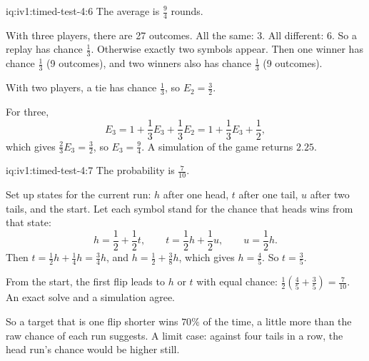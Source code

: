 \begin{solution}{iq:iv1:timed-test-4:6}
The average is $\frac94$ rounds.

With three players, there are 27 outcomes. All the same: 3. All different: 6. So a replay has chance $\frac13$. Otherwise exactly two symbols appear. Then one winner has chance $\frac13$ (9 outcomes), and two winners also has chance $\frac13$ (9 outcomes).

With two players, a tie has chance $\frac13$, so $E_2 = \frac32$.

For three,
\[
E_3 = 1 + \frac13E_3 + \frac13E_2 = 1 + \frac13E_3 + \frac12,
\]
which gives $\frac23E_3 = \frac32$, so $E_3 = \frac94$. A simulation of the game returns $2.25$.

\end{solution}

\begin{solution}{iq:iv1:timed-test-4:7}
The probability is $\frac{7}{10}$.

Set up states for the current run: $h$ after one head, $t$ after one tail, $u$ after two tails, and the start. Let each symbol stand for the chance that heads wins from that state:
\[
h = \frac12 + \frac12t, \qquad t = \frac12h + \frac12u, \qquad u = \frac12h.
\]
Then $t = \frac12h + \frac14h = \frac34h$, and $h = \frac12 + \frac38h$, which gives $h = \frac45$. So $t = \frac35$.

From the start, the first flip leads to $h$ or $t$ with equal chance: $\frac12(\frac45 + \frac35) = \frac{7}{10}$. An exact solve and a simulation agree.

So a target that is one flip shorter wins $70\%$ of the time, a little more than the raw chance of each run suggests. A limit case: against four tails in a row, the head run's chance would be higher still.

\end{solution}

